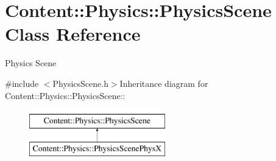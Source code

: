 \hypertarget{classContent_1_1Physics_1_1PhysicsScene}{
\section{Content::Physics::PhysicsScene Class Reference}
\label{classContent_1_1Physics_1_1PhysicsScene}
}


Physics Scene  


{\ttfamily \#include $<$PhysicsScene.h$>$}Inheritance diagram for Content::Physics::PhysicsScene::\begin{figure}[H]
\begin{center}
\leavevmode
\includegraphics[height=2cm]{classContent_1_1Physics_1_1PhysicsScene}
\end{center}
\end{figure}
